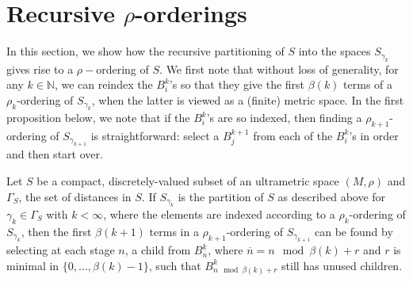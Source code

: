 \section*{Recursive $\rho$-orderings}
In this section, we show how the recursive partitioning of $S$ into the spaces $S_{\gamma_k}$ gives rise to a $\rho-$ordering of $S$. We first note that without loss of generality, for any $k \in \mathbb{N}$, we can reindex the $B^k_i$'s so that they give the first $\beta(k)$ terms of a $\rho_k$-ordering of $S_{\gamma_k}$, when the latter is viewed as a (finite) metric space. In the first proposition below, we note that if the $B^k_i$'s are so indexed, then finding a $\rho_{k+1}$-ordering of $S_{\gamma_{k+1}}$ is straightforward: select a $B^{k+1}_j$ from each of the $B^k_i$'s in order and then start over.\\  

\begin{proposition} 
Let $S$ be a compact, discretely-valued subset of an ultrametric space $(M, \rho)$ and $\Gamma_S$, the set of distances in $S$. If $S_{\gamma_k}$ is the partition of $S$ as described above for $\gamma_k \in \Gamma_S$ with $k < \infty$, where the elements are indexed according to a $\rho_k$-ordering of $S_{\gamma_k}$, then the first $\beta(k+1)$ terms in a $\rho_{k+1}$-ordering of $S_{\gamma_{k+1}}$ can be found by selecting at each stage $n$, a child from $B^k_{\overline{n}}$, where $\overline{n} = n \mod \beta(k) +r $ and $r$ is minimal in $\{0,\ldots,\beta(k)-1\}$, such that $B^k_{n \mod \beta(k) +r}$ still has unused children.
\end{proposition}

